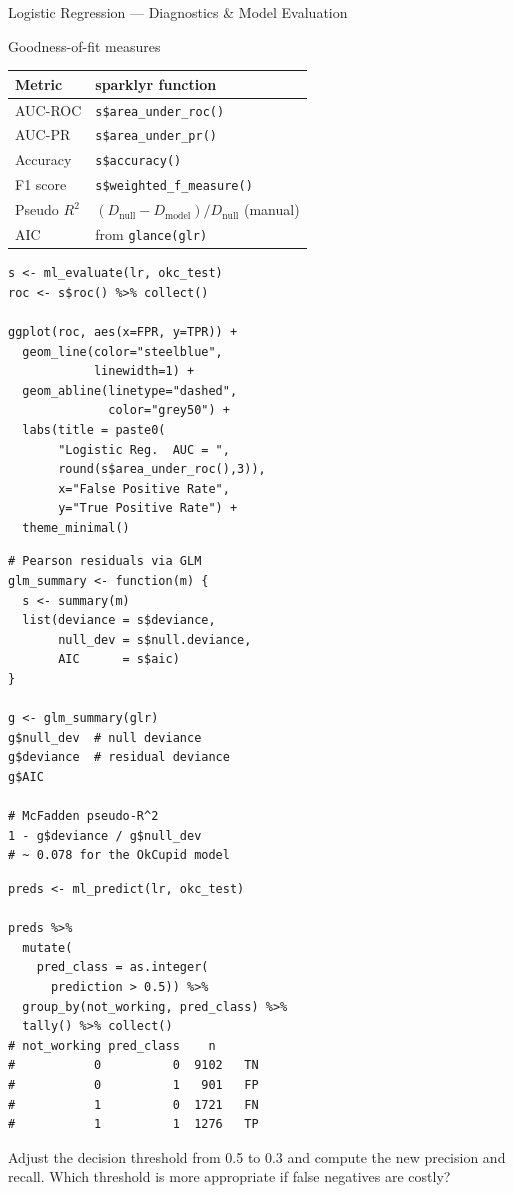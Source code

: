 \documentclass[11pt, aspectratio=169]{beamer}
\begin{document}
\begin{frame}{Logistic Regression --- Diagnostics \& Model Evaluation}
	\begin{block}{Goodness-of-fit measures}
				\begin{tabular}{ll}
					\toprule
					\textbf{Metric} & \textbf{sparklyr function}\\
					\midrule
					AUC-ROC     & \texttt{s\$area\_under\_roc()}\\
					AUC-PR      & \texttt{s\$area\_under\_pr()}\\
					Accuracy    & \texttt{s\$accuracy()}\\
					F1 score    & \texttt{s\$weighted\_f\_measure()}\\
					Pseudo $R^2$ & $(D_{\text{null}}-D_{\text{model}})/D_{\text{null}}$ (manual)\\
					AIC         & from \texttt{glance(glr)}\\
					\bottomrule
				\end{tabular}
			\end{block}
			\begin{lstlisting}[title={ROC curve (therinspark.com §4.4.1)}]
s <- ml_evaluate(lr, okc_test)
roc <- s$roc() %>% collect()

ggplot(roc, aes(x=FPR, y=TPR)) +
  geom_line(color="steelblue",
            linewidth=1) +
  geom_abline(linetype="dashed",
              color="grey50") +
  labs(title = paste0(
       "Logistic Reg.  AUC = ",
       round(s$area_under_roc(),3)),
       x="False Positive Rate",
       y="True Positive Rate") +
  theme_minimal()
			\end{lstlisting}
		\begin{lstlisting}[title={Residual deviance diagnostics}]
# Pearson residuals via GLM
glm_summary <- function(m) {
  s <- summary(m)
  list(deviance = s$deviance,
       null_dev = s$null.deviance,
       AIC      = s$aic)
}

g <- glm_summary(glr)
g$null_dev  # null deviance
g$deviance  # residual deviance
g$AIC

# McFadden pseudo-R^2
1 - g$deviance / g$null_dev
# ~ 0.078 for the OkCupid model
			\end{lstlisting}
			\begin{lstlisting}[title={Confusion matrix at 0.5 threshold}]
preds <- ml_predict(lr, okc_test)

preds %>%
  mutate(
    pred_class = as.integer(
      prediction > 0.5)) %>%
  group_by(not_working, pred_class) %>%
  tally() %>% collect()
# not_working pred_class    n
#           0          0  9102   TN
#           0          1   901   FP
#           1          0  1721   FN
#           1          1  1276   TP
			\end{lstlisting}
			\begin{exercise}[Exercise]
				Adjust the decision threshold from 0.5 to 0.3 and compute
				the new precision and recall.  Which threshold is more
				appropriate if false negatives are costly?
			\end{exercise}
		\end{frame}
\end{document}
